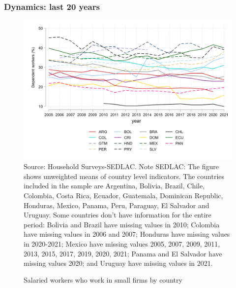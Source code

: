 \documentclass{beamer}
\begin{document}
\begin{frame}
\frametitle{Dynamics: last 20 years}
\begin{figure}[!htb]
        \justifying
        \caption{Salaried workers who work in small firms by country}     
        \includegraphics[scale=.2]{latex/figures/Evolution/dependents_small_all.png}
        \label{fig:Evolution_salariedsmall}
        \footnotesize{Source: Household Surveys-SEDLAC.}
       \footnotesize{Note SEDLAC: The figure shows unweighted means of country level indicators. The countries included in the sample are Argentina, Bolivia, Brazil, Chile, Colombia, Costa Rica, Ecuador, Guatemala, Dominican Republic, Honduras, Mexico, Panama, Peru, Paraguay, El Salvador and Uruguay. Some countries don’t have information for the entire period: Bolivia and Brazil have missing values in 2010; Colombia have missing values in 2006 and 2007; Honduras have missing values in 2020-2021; Mexico have missing values 2005, 2007, 2009, 2011, 2013, 2015, 2017, 2019, 2020, 2021; Panama and El Salvador have missing values 2020; and Uruguay have missing values in 2021.}
 \end{figure}
 \end{frame}
\end{document}
